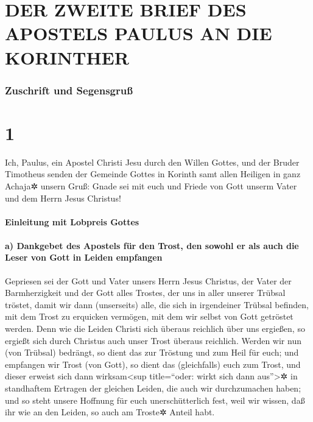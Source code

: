 \hypertarget{der-zweite-brief-des-apostels-paulus-an-die-korinther}{%
\section{DER ZWEITE BRIEF DES APOSTELS PAULUS AN DIE
KORINTHER}\label{der-zweite-brief-des-apostels-paulus-an-die-korinther}}

\hypertarget{zuschrift-und-segensgruuxdf}{%
\subsubsection{Zuschrift und
Segensgruß}\label{zuschrift-und-segensgruuxdf}}

\hypertarget{section}{%
\section{1}\label{section}}

 Ich, Paulus, ein Apostel Christi Jesu durch den Willen
Gottes, und der Bruder Timotheus senden der Gemeinde Gottes in Korinth
samt allen Heiligen in ganz Achaja✲ unsern Gruß:  Gnade
sei mit euch und Friede von Gott unserm Vater und dem Herrn Jesus
Christus!

\hypertarget{einleitung-mit-lobpreis-gottes}{%
\paragraph{Einleitung mit Lobpreis
Gottes}\label{einleitung-mit-lobpreis-gottes}}

\hypertarget{a-dankgebet-des-apostels-fuxfcr-den-trost-den-sowohl-er-als-auch-die-leser-von-gott-in-leiden-empfangen}{%
\paragraph{a) Dankgebet des Apostels für den Trost, den sowohl er als
auch die Leser von Gott in Leiden
empfangen}\label{a-dankgebet-des-apostels-fuxfcr-den-trost-den-sowohl-er-als-auch-die-leser-von-gott-in-leiden-empfangen}}

 Gepriesen sei der Gott und Vater unsers Herrn Jesus
Christus, der Vater der Barmherzigkeit und der Gott alles Trostes,
 der uns in aller unserer Trübsal tröstet, damit wir dann
(unserseits) alle, die sich in irgendeiner Trübsal befinden, mit dem
Trost zu erquicken vermögen, mit dem wir selbst von Gott getröstet
werden.  Denn wie die Leiden Christi sich überaus
reichlich über uns ergießen, so ergießt sich durch Christus auch unser
Trost überaus reichlich.  Werden wir nun (von Trübsal)
bedrängt, so dient das zur Tröstung und zum Heil für euch; und empfangen
wir Trost (von Gott), so dient das (gleichfalls) euch zum Trost, und
dieser erweist sich dann wirksam\textless sup title=``oder: wirkt sich
dann aus''\textgreater✲ in standhaftem Ertragen der gleichen Leiden, die
auch wir durchzumachen haben;  und so steht unsere
Hoffnung für euch unerschütterlich fest, weil wir wissen, daß ihr wie an
den Leiden, so auch am Troste✲ Anteil habt.

